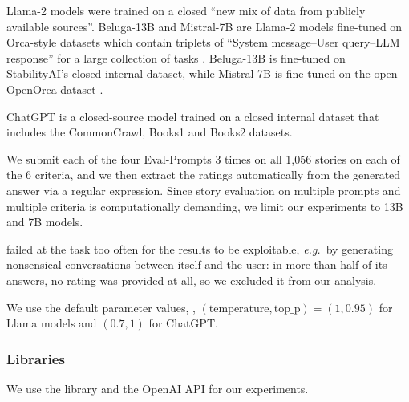 Llama-2 models were trained on a closed ``new mix of data from publicly available sources''. Beluga-13B and Mistral-7B are Llama-2 models fine-tuned on Orca-style datasets which contain triplets of ``System message--User query--LLM response'' for a large collection of tasks \citep{mukherjee2023orca}. Beluga-13B is fine-tuned on StabilityAI's closed internal dataset, while Mistral-7B is fine-tuned on the open OpenOrca dataset \citep{lian2023openorca}. 

ChatGPT \citep{brown2020language, ouyang2022training} is a closed-source model trained on a closed internal dataset that includes the CommonCrawl, Books1 and Books2 datasets.

We submit each of the four Eval-Prompts 3 times on all 1,056 {\hanna} stories on each of the 6 criteria, and we then extract the ratings automatically from the generated answer via a regular expression. Since story evaluation on multiple prompts and multiple criteria is computationally demanding, we limit our experiments to 13B and 7B models.

{\llamasmall} failed at the task too often for the results to be exploitable, \textit{e.g.}\ by generating nonsensical conversations between itself and the user: in more than half of its answers, no rating was provided at all, so we excluded it from our analysis.

We use the default parameter values, \ie, $(\textrm{temperature}, \textrm{top\_p}) = (1, 0.95)$ for Llama models and $(0.7, 1)$ for ChatGPT.

\subsubsection{Libraries} We use the {\transf} library \citep{wolf-etal-2020-transformers} and the OpenAI API for our experiments.

